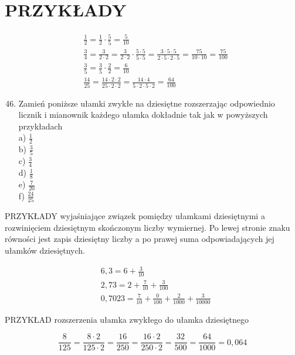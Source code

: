 \documentclass[10pt]{article}
\begin{document}
\section*{PRZYKŁADY}
\[
\begin{aligned}
& \frac{1}{2}=\frac{1}{2} \cdot \frac{5}{5}=\frac{5}{10} \\
& \frac{3}{4}=\frac{3}{2 \cdot 2}=\frac{3}{2 \cdot 2} \cdot \frac{5 \cdot 5}{5 \cdot 5}=\frac{3 \cdot 5 \cdot 5}{2 \cdot 5 \cdot 2 \cdot 5}=\frac{75}{10 \cdot 10}=\frac{75}{100} \\
& \frac{3}{5}=\frac{3}{5} \cdot \frac{2}{2}=\frac{6}{10} \\
& \frac{14}{25}=\frac{14 \cdot 2 \cdot 2}{25 \cdot 2 \cdot 2}=\frac{14 \cdot 4}{5 \cdot 2 \cdot 5 \cdot 2}=\frac{64}{100}
\end{aligned}
\]

\begin{enumerate}
  \setcounter{enumi}{45}
  \item Zamień poniższe ułamki zwykłe na dziesiętne rozszerzając odpowiednio licznik i mianownik każdego ułamka dokładnie tak jak w powyższych przykładach\\
a) \(\frac{1}{2}\)\\
b) \(\frac{3}{5}\)\\
c) \(\frac{3}{4}\)\\
d) \(\frac{1}{8}\)\\
e) \(\frac{7}{20}\)\\
f) \(\frac{24}{25}\)
\end{enumerate}

PRZYKŁADY wyjaśniające związek pomiędzy ułamkami dziesiętnymi a rozwinięciem dziesiętnym skończonym liczby wymiernej. Po lewej stronie znaku równości jest zapis dziesiętny liczby a po prawej suma odpowiadających jej ułamków dziesiętnych.

\[
\begin{aligned}
& 6,3=6+\frac{3}{10} \\
& 2,73=2+\frac{7}{10}+\frac{3}{100} \\
& 0,7023=\frac{7}{10}+\frac{0}{100}+\frac{2}{1000}+\frac{3}{10000}
\end{aligned}
\]

PRZYKŁAD rozszerzenia ułamka zwykłego do ułamka dziesiętnego

\[
\frac{8}{125}=\frac{8 \cdot 2}{125 \cdot 2}=\frac{16}{250}=\frac{16 \cdot 2}{250 \cdot 2}=\frac{32}{500}=\frac{64}{1000}=0,064
\]
\end{document}
